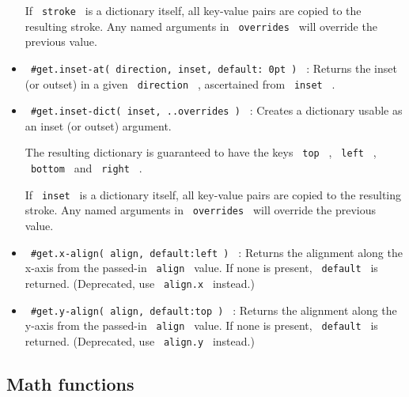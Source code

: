\begin{itemize}
  If \texttt{\ stroke\ } is a dictionary itself, all key-value pairs are
  copied to the resulting stroke. Any named arguments in
  \texttt{\ overrides\ } will override the previous value.
\item
  \texttt{\ \#get.inset-at(\ direction,\ inset,\ default:\ 0pt\ )\ } :
  Returns the inset (or outset) in a given \texttt{\ direction\ } ,
  ascertained from \texttt{\ inset\ } .
\item
  \texttt{\ \#get.inset-dict(\ inset,\ ..overrides\ )\ } : Creates a
  dictionary usable as an inset (or outset) argument.

  The resulting dictionary is guaranteed to have the keys
  \texttt{\ top\ } , \texttt{\ left\ } , \texttt{\ bottom\ } and
  \texttt{\ right\ } .

  If \texttt{\ inset\ } is a dictionary itself, all key-value pairs are
  copied to the resulting stroke. Any named arguments in
  \texttt{\ overrides\ } will override the previous value.
\item
  \texttt{\ \#get.x-align(\ align,\ default:left\ )\ } : Returns the
  alignment along the x-axis from the passed-in \texttt{\ align\ }
  value. If none is present, \texttt{\ default\ } is returned.
  (Deprecated, use \texttt{\ align.x\ } instead.)

\begin{Shaded}
\begin{Highlighting}[]
\OperatorTok{{-}}\OperatorTok{+}
\end{Highlighting}
\end{Shaded}
\item
  \texttt{\ \#get.y-align(\ align,\ default:top\ )\ } : Returns the
  alignment along the y-axis from the passed-in \texttt{\ align\ }
  value. If none is present, \texttt{\ default\ } is returned.
  (Deprecated, use \texttt{\ align.y\ } instead.)
\end{itemize}

\subsection{Math functions}\label{math-functions}

\begin{Shaded}
\begin{Highlighting}[]
\OperatorTok{:}
\end{Highlighting}
\end{Shaded}

